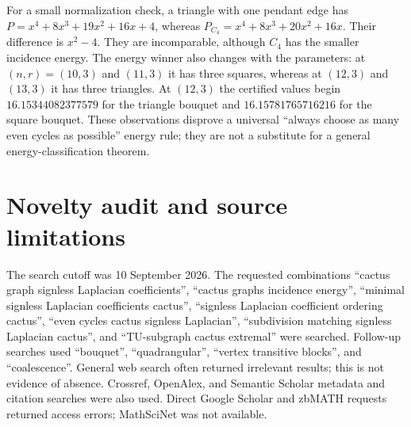 \documentclass[12pt]{amsart}
\theoremstyle{definition}
\theoremstyle{remark}
\numberwithin{equation}{section}
\begin{document}
For a small normalization check, a triangle with one pendant edge has
$P=x^4+8x^3+19x^2+16x+4$, whereas
$P_{C_4}=x^4+8x^3+20x^2+16x$. Their difference is $x^2-4$.
They are incomparable, although $C_4$ has the smaller incidence energy.
The energy winner also changes with the parameters: at $(n,r)=(10,3)$
and $(11,3)$ it has three squares, whereas at $(12,3)$ and $(13,3)$ it
has three triangles. At $(12,3)$ the certified values begin
$16.15344082377579$ for the triangle bouquet and
$16.15781765716216$ for the square bouquet. These observations disprove a
universal ``always choose as many even cycles as possible'' energy rule;
they are not a substitute for a general energy-classification theorem.

\section{Novelty audit and source limitations}
The search cutoff was 10 September 2026. The requested combinations
``cactus graph signless Laplacian coefficients'', ``cactus graphs incidence
energy'', ``minimal signless Laplacian coefficients cactus'', ``signless
Laplacian coefficient ordering cactus'', ``even cycles cactus signless
Laplacian'', ``subdivision matching signless Laplacian cactus'', and
``TU-subgraph cactus extremal'' were searched. Follow-up searches used
``bouquet'', ``quadrangular'', ``vertex transitive blocks'', and
``coalescence''. General web search often returned irrelevant results;
this is not evidence of absence. Crossref, OpenAlex, and Semantic Scholar
metadata and citation searches were also used. Direct Google Scholar and
zbMATH requests returned access errors; MathSciNet was not available.
\end{document}
